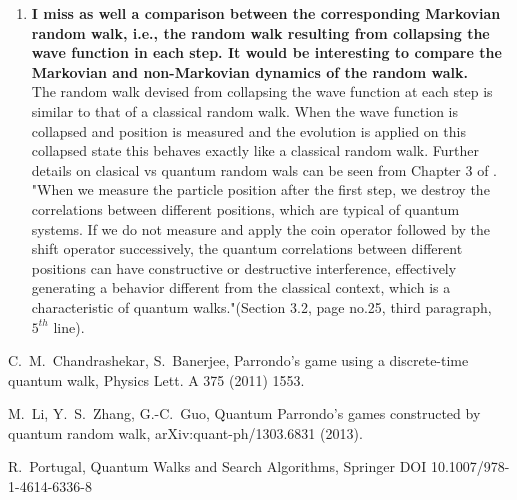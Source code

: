 \documentclass[10pt,a4paper]{article}
\begin{document}
\begin{enumerate}
\item \textbf{I miss as well a comparison between the corresponding Markovian random
walk, i.e., the random walk resulting from collapsing the wave function
in each step. It would be interesting to compare the Markovian and
non-Markovian dynamics of the random walk.}\\
The random walk devised from collapsing the wave function at each step is similar to that of a classical random walk. When the wave function is collapsed and position is measured and the evolution is applied on this collapsed state this behaves exactly like a classical random walk. Further details on clasical vs quantum random wals can be seen from Chapter 3 of \cite{portugal}. "When we measure the particle position after the first step, we
destroy the correlations between different positions, which are typical of quantum
systems. If we do not measure and apply the coin operator followed by the shift
operator successively, the quantum correlations between different positions can have
constructive or destructive interference, effectively generating a behavior different
from the classical context, which is a characteristic of quantum walks."(Section 3.2, page no.25, third paragraph, $5^{th}$ line).
 

\end{enumerate}

\begin{thebibliography}{99}
C.~M.~Chandrashekar, S.~Banerjee, Parrondo's game using a discrete-time quantum walk, Physics Lett. A 375 (2011) 1553.

M.~Li, Y.~S.~Zhang, G.-C.~Guo, Quantum Parrondo's games constructed by quantum random walk, arXiv:quant-ph/1303.6831 (2013).

R.~Portugal, Quantum Walks and Search Algorithms, Springer DOI 10.1007/978-1-4614-6336-8
\end{thebibliography}
\end{document}
